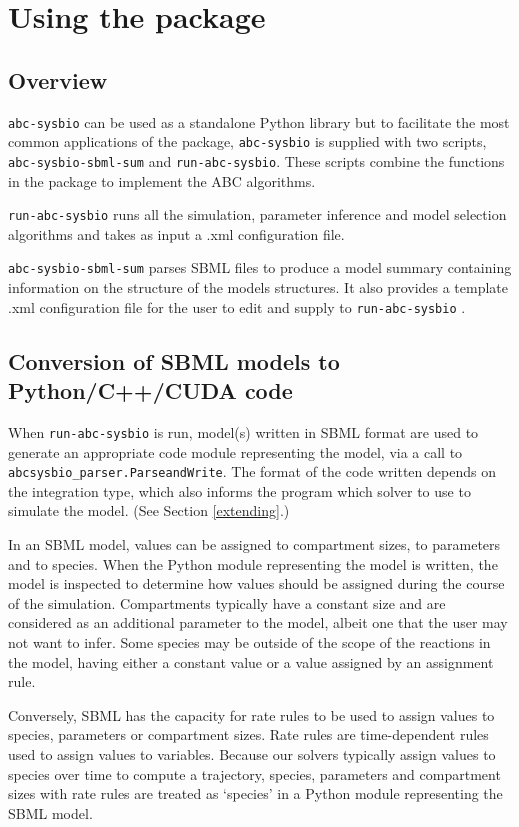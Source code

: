 \documentclass[a4paper]{report}
\begin{document}
\chapter{Using the package}
\label{usage}
\section{Overview}
\verb$abc-sysbio$ can be used as a standalone Python library but to facilitate the most common applications of the package, \verb$abc-sysbio$ is supplied with two scripts, \verb$abc-sysbio-sbml-sum$ and \verb$run-abc-sysbio$. These scripts combine the functions in the package to implement the ABC algorithms.

\verb$run-abc-sysbio$ runs all the simulation, parameter inference and model selection algorithms and takes as input a .xml configuration file.

\verb$abc-sysbio-sbml-sum$ parses SBML files to produce a model summary containing information on the structure of the models structures. It also provides a template .xml configuration file for the user to edit and supply to \verb$run-abc-sysbio$ .

\section{Conversion of SBML models to Python/C++/CUDA code}
When \verb$run-abc-sysbio$ is run, model(s) written in SBML format are used to generate an appropriate code module representing the model, via a call to \verb$abcsysbio_parser.ParseandWrite$. The format of the code written depends on the integration type, which also informs the program which solver to use to simulate the model. (See Section \ref{extending}.)

In an SBML model, values can be assigned to compartment sizes, to parameters and to species. When the Python module representing the model is written, the model is inspected to determine how values should be assigned during the course of the simulation. Compartments typically have a constant size and are considered as an additional parameter to the model, albeit one that the user may not want to infer. Some species may be outside of the scope of the reactions in the model, having either a constant value or a value assigned by an assignment rule. 

Conversely, SBML has the capacity for rate rules to be used to assign values to species, parameters or compartment sizes. Rate rules are time-dependent rules used to assign values to variables. Because our solvers typically assign values to species over time to compute a trajectory, species, parameters and compartment sizes with rate rules are treated as `species' in a Python module representing the SBML model.
\end{document}
